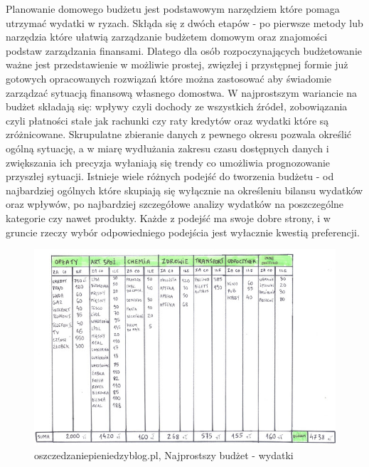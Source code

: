 \documentclass[a4paper,10pt, twoside]{report}
\begin{document}
\begin{large}
{Planowanie domowego budżetu jest podstawowym narzędziem które pomaga utrzymać 
wydatki w ryzach. Skłąda się z dwóch etapów - po pierwsze metody lub narzędzia 
które ułatwią zarządzanie budżetem domowym oraz znajomości podstaw zarządzania 
finansami. Dlatego dla osób rozpoczynających budżetowanie ważne jest 
przedstawienie w możliwie prostej, zwięzłej i przystępnej formie już gotowych 
opracowanych rozwiązań które można zastosować aby świadomie zarządzać sytuacją 
finansową własnego domostwa. W najprostszym wariancie na 
budżet \cite{o24_budzetowanie}\cite{budget}\cite{iwućbudżet}\cite{mintbudget}\cite{ingbudżet}\cite{budzetdomowypodkontrola} 
składają się: wpływy czyli dochody ze wszystkich źródeł, zobowiązania czyli 
płatności stałe jak rachunki czy raty kredytów oraz wydatki które są 
zróżnicowane. Skrupulatne zbieranie danych z pewnego okresu pozwala określić 
ogólną sytuację, a w miarę wydłużania zakresu czasu dostępnych danych i 
zwiększania ich precyzja wyłaniają się trendy co umożliwia prognozowanie 
przyszłej sytuacji. Istnieje wiele różnych podejść do tworzenia budżetu - od 
najbardziej ogólnych które skupiają się wyłącznie na określeniu bilansu wydatków
 oraz wpływów, po najbardziej szczegółowe analizy wydatków na poszczególne 
kategorie czy nawet produkty. Każde z podejść ma swoje dobre strony, i w gruncie
 rzeczy wybór odpowiedniego podejścia jest wyłacznie kwestią preferencji.}

\begin{figure}[H]           %
    \centering
    \includegraphics[width=12cm]{figures/oszczedzaniepieniedzyblog-pl_wydatki.jpg}
    \caption{oszczedzaniepieniedzyblog.pl, Najprostszy budżet - wydatki}
    \label{fig:prostybudżetwydatki}
\end{figure}


\end{large}
\end{document}
